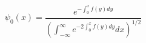 \begin{equation}\label{zmode}
\psi_0(x)=\frac{e^{-\int_{0}^xf(y)dy}}
{\left(\int_{-\infty}^\infty e^{-2\int_{0}^x f(y)dy}dx\right)^{1/2}}
\end{equation}

